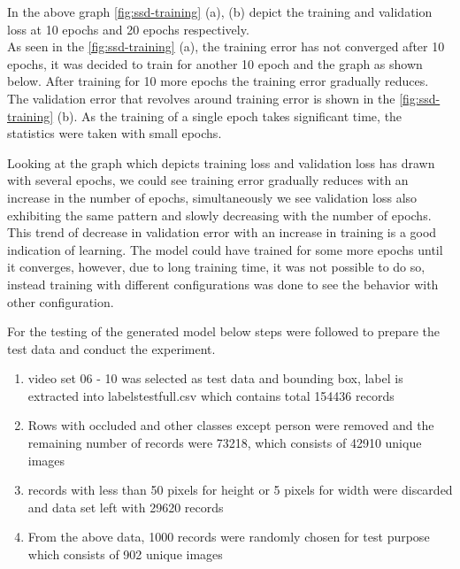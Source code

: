 In the above graph \ref{fig:ssd-training} (a), (b) depict the training and validation loss at 10 epochs and 20 epochs respectively. \\


As seen in the \ref{fig:ssd-training} (a), the training error has not converged after 10 epochs, it was decided to train for another 10 epoch and the graph as shown below. After training for 10 more epochs the training error gradually reduces. The validation error that revolves around training error is shown in the \ref{fig:ssd-training} (b). As the training of a single epoch takes significant time, the statistics were taken with small epochs.


\newpara
Looking at the graph which depicts training loss and validation loss has drawn with several epochs, we could see training error gradually reduces with an increase in the number of epochs, simultaneously we see validation loss also exhibiting the same pattern and slowly decreasing with the number of epochs. This trend of decrease in validation error with an increase in training is a good indication of learning. The model could have trained for some more epochs until it converges, however, due to long training time, it was not possible to do so, instead training with different configurations was done to see the behavior with other configuration.

For the testing of the generated model below steps were followed to prepare the test data and conduct the experiment.
\begin{enumerate}
	\item video set 06 - 10 was selected as test data and bounding box, label is extracted into labels\textunderscore test\textunderscore full.csv which contains total 154436 records
	\item Rows with occluded and other classes except person were removed and the remaining number of records were 73218, which consists of 42910 unique images 
	\item records with less than 50 pixels for height or 5 pixels for width were discarded and data set left with 29620 records
	\item From the above data, 1000 records were randomly chosen for test purpose which consists of 902 unique images
\end{enumerate}

